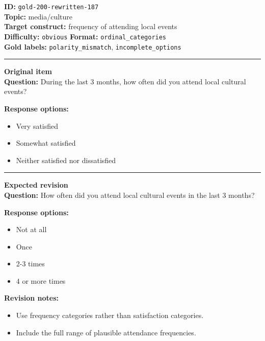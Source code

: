 \documentclass[10pt,a4paper]{article}
\newcommand{\sectionline}{\vspace{0.15em}\hrule\vspace{0.35em}}
\begin{document}
\begin{tcolorbox}[colframe=FlawRed,colback=white,colbacktitle=FlawRed!9,coltitle=black,title={Item 187\hfill Flawed item}]
\textbf{ID:} \texttt{gold-200-rewritten-187}\\
\textbf{Topic:} media/culture\\
\textbf{Target construct:} frequency of attending local events\\
\textbf{Difficulty:} \texttt{obvious} \quad \textbf{Format:} \texttt{ordinal\_categories}\\
\textbf{Gold labels:} \texttt{polarity\_mismatch}, \texttt{incomplete\_options}\\
\sectionline
\textbf{Original item}\\
\textbf{Question:} During the last 3 months, how often did you attend local cultural events?
\par\textbf{Response options:}
\begin{itemize}
\item Very satisfied
\item Somewhat satisfied
\item Neither satisfied nor dissatisfied
\end{itemize}
\sectionline
\textbf{Expected revision}\\
\textbf{Question:} How often did you attend local cultural events in the last 3 months?
\par\textbf{Response options:}
\begin{itemize}
\item Not at all
\item Once
\item 2-3 times
\item 4 or more times
\end{itemize}
\par\textbf{Revision notes:}
\begin{itemize}
\item Use frequency categories rather than satisfaction categories.
\item Include the full range of plausible attendance frequencies.
\end{itemize}
\end{tcolorbox}
\end{document}
